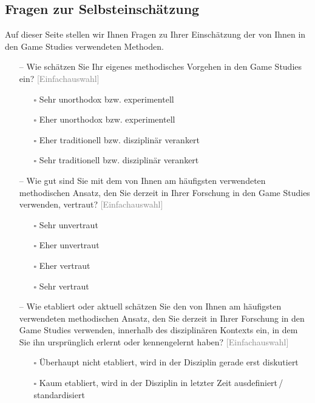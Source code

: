 \documentclass{scrartcl}
\begin{document}
\subsection*{Fragen zur Selbsteinschätzung}
Auf dieser Seite stellen wir Ihnen Fragen zu Ihrer Einschätzung der von Ihnen in den Game Studies verwendeten Methoden.

\begin{itemize}
   \item[--] Wie schätzen Sie Ihr eigenes methodisches Vorgehen in den Game Studies ein? \textcolor{gray}{\textsf{[Einfachauswahl]}}
   \begin{itemize}
      \item[$\square$] Sehr unorthodox bzw. experimentell
      \item[$\square$] Eher unorthodox bzw. experimentell
      \item[$\square$] Eher traditionell bzw. disziplinär verankert
      \item[$\square$] Sehr traditionell bzw. disziplinär verankert
   \end{itemize}
   \item[--] Wie gut sind Sie mit dem von Ihnen am häufigsten verwendeten methodischen Ansatz, den Sie derzeit in Ihrer Forschung in den Game Studies verwenden, vertraut? \textcolor{gray}{\textsf{[Einfachauswahl]}}
   \begin{itemize}
      \item[$\square$] Sehr unvertraut
      \item[$\square$] Eher unvertraut
      \item[$\square$] Eher vertraut
      \item[$\square$] Sehr vertraut
   \end{itemize}
   \item[--] Wie etabliert oder aktuell schätzen Sie den von Ihnen am häufigsten verwendeten methodischen Ansatz, den Sie derzeit in Ihrer Forschung in den Game Studies verwenden, innerhalb des disziplinären Kontexts ein, in dem Sie ihn ursprünglich erlernt oder kennengelernt haben? \textcolor{gray}{\textsf{[Einfachauswahl]}}
   \begin{itemize}
      \item[$\square$] Überhaupt nicht etabliert, wird in der Disziplin gerade erst diskutiert
      \item[$\square$] Kaum etabliert, wird in der Disziplin in letzter Zeit ausdefiniert\,/\,standardisiert

\end{itemize}
\end{itemize}
\end{document}
